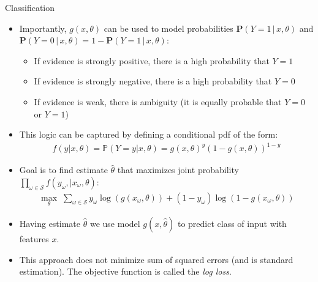 \documentclass[9pt]{beamer}
\begin{document}
\begin{frame}{Classification}


\begin{itemize}

\item Importantly, $g(x,\theta)$ can be used to model probabilities $\mathbf{P}(Y=1\,|\,x,\theta)$ and $\mathbf{P}(Y=0\,|\,x,\theta)=1-\mathbf{P}(Y=1\,|\,x,\theta)$:

\begin{itemize}
\item If evidence is strongly positive, there is a high probability that $Y=1$
\item If evidence is strongly negative, there is a high probability that  $Y=0$
\item If evidence is weak, there is ambiguity (it is equally probable that $Y=0$ or $Y=1$)
\end{itemize}

\item This logic can be captured by defining a conditional pdf of the form:
\begin{align*}
f(y|x,\theta)=\mathbb{P}(Y=y|x,\theta)=g(x,\theta)^y(1-g(x,\theta))^{1-y}
\end{align*}
\item Goal is to find estimate $\hat{\theta}$ that maximizes joint probability $\prod_{\omega \in \mathcal{S}}f(y_\omega,|x_\omega,\theta)$:
\begin{align*}
\max_{\theta}\; \sum_{\omega \in \mathcal{S}}y_\omega\log(g(x_\omega,\theta))+(1-y_\omega)\log(1-g(x_\omega,\theta))
\end{align*}

\item Having estimate $\hat{\theta}$ we use model $g(x,\hat{\theta})$ to predict class of input with features $x$. 

\item This approach does not minimize sum of squared errors (and is standard estimation).  The objective function is called the {\em log loss}. 
\end{itemize}

\end{frame}

\end{document}
